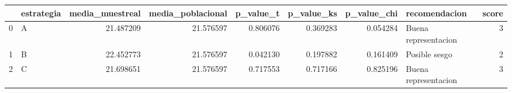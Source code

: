 \begin{tabular}{llrrrrrlr}
\toprule
 & estrategia & media_muestreal & media_poblacional & p_value_t & p_value_ks & p_value_chi & recomendacion & score \\
\midrule
0 & A & 21.487209 & 21.576597 & 0.806076 & 0.369283 & 0.054284 & Buena representacion & 3 \\
1 & B & 22.452773 & 21.576597 & 0.042130 & 0.197882 & 0.161409 & Posible sesgo & 2 \\
2 & C & 21.698651 & 21.576597 & 0.717553 & 0.717166 & 0.825196 & Buena representacion & 3 \\
\bottomrule
\end{tabular}
